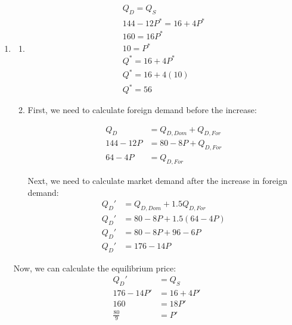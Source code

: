 \documentclass{article}
\begin{document}
\begin{enumerate}
\item
	\begin{enumerate}
	
	\item
	\begin{gather*}
	Q_D = Q_S \\
	144 - 12P^* = 16 + 4P^* \\
	160 = 16P^* \\
	10 = P^* \\
	Q^* = 16 + 4P^* \\
	Q^* = 16 + 4(10) \\
	Q^* = 56
	\end{gather*}
	
	\item First, we need to calculate foreign demand before the increase:

	\begin{align*}
	Q_D &= Q_{D,Dom} + Q_{D,For} \\
	144 - 12 P &= 80 - 8P + Q_{D,For} \\
	64 - 4P &= Q_{D,For}
	\end{align*}
	
	Next, we need to calculate market demand after the increase in foreign demand:
	\begin{align*}
	Q_D' &= Q_{D,Dom} + 1.5Q_{D,For} \\
	Q_D' &= 80 - 8P + 1.5(64 - 4P) \\
	Q_D' &= 80 - 8P + 96 - 6P \\
	Q_D' &= 176 - 14P
	\end{align*}
	\end{enumerate}
	
	Now, we can calculate the equilibrium price:
	\begin{align*}
	Q_D' &= Q_S \\
	176 - 14P' &= 16 + 4P' \\
	160 &= 18P' \\
	\frac{80}{9} &= P'
	\end{align*}
	
\end{enumerate}
\end{document}

